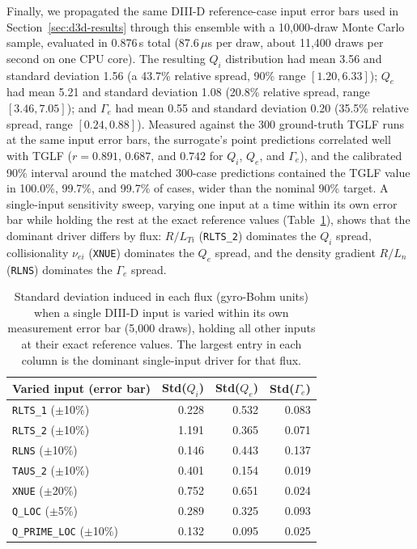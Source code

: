 \documentclass[12pt,letterpaper]{article}
\begin{document}
Finally, we propagated the same DIII-D reference-case input error bars used
in Section~\ref{sec:d3d-results} through this ensemble with a 10,000-draw
Monte Carlo sample, evaluated in 0.876\,s total (87.6\,$\mu$s per draw,
about 11,400 draws per second on one CPU core). The resulting $Q_i$
distribution had mean 3.56 and standard deviation 1.56 (a 43.7\% relative
spread, 90\% range $[1.20, 6.33]$); $Q_e$ had mean 5.21 and standard
deviation 1.08 (20.8\% relative spread, range $[3.46, 7.05]$); and $\Gamma_e$
had mean 0.55 and standard deviation 0.20 (35.5\% relative spread, range
$[0.24, 0.88]$). Measured against the 300 ground-truth TGLF runs at the same
input error bars, the surrogate's point predictions correlated well with TGLF
($r = 0.891$, $0.687$, and $0.742$ for $Q_i$, $Q_e$, and $\Gamma_e$), and the
calibrated 90\% interval around the matched 300-case predictions contained
the TGLF value in 100.0\%, 99.7\%, and 99.7\% of cases, wider than the
nominal 90\% target. A single-input sensitivity sweep, varying one input at a
time within its own error bar while holding the rest at the exact reference
values (Table~\ref{tab:gbdt-d3d-sensitivity}), shows that the dominant driver
differs by flux: $R/L_{Ti}$ (\texttt{RLTS\_2}) dominates the $Q_i$ spread,
collisionality $\nu_{ei}$ (\texttt{XNUE}) dominates the $Q_e$ spread, and the
density gradient $R/L_n$ (\texttt{RLNS}) dominates the $\Gamma_e$ spread.

\begin{table}[htbp]
  \centering
  \small
  \begin{tabular}{lrrr}
    \toprule
    Varied input (error bar)     & Std($Q_i$) & Std($Q_e$) & Std($\Gamma_e$) \\
    \midrule
    \texttt{RLTS\_1} ($\pm$10\%) & 0.228      & 0.532      & 0.083           \\
    \texttt{RLTS\_2} ($\pm$10\%) & 1.191      & 0.365      & 0.071           \\
    \texttt{RLNS} ($\pm$10\%)    & 0.146      & 0.443      & 0.137           \\
    \texttt{TAUS\_2} ($\pm$10\%) & 0.401      & 0.154      & 0.019           \\
    \texttt{XNUE} ($\pm$20\%)    & 0.752      & 0.651      & 0.024           \\
    \texttt{Q\_LOC} ($\pm$5\%)   & 0.289      & 0.325      & 0.093           \\
    \texttt{Q\_PRIME\_LOC} ($\pm$10\%) & 0.132 & 0.095     & 0.025           \\
    \bottomrule
  \end{tabular}
  \caption{Standard deviation induced in each flux (gyro-Bohm units) when a
    single DIII-D input is varied within its own measurement error bar
    (5,000 draws), holding all other inputs at their exact reference values.
    The largest entry in each column is the dominant single-input driver for
    that flux.}
  \label{tab:gbdt-d3d-sensitivity}
\end{table}
\end{document}

